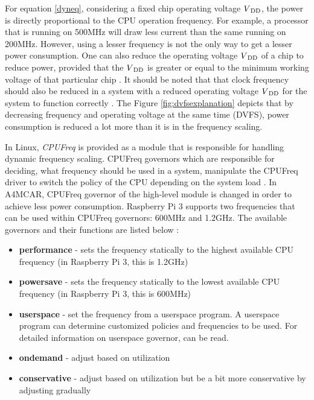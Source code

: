 For equation \ref{dyneq}, considering a fixed chip operating voltage ${V\textsubscript{DD}}$, the power is directly proportional to the CPU operation frequency. For example, a processor that is running on 500MHz will draw less current than the same running on 200MHz. However, using a lesser frequency is not the only way to get a lesser power consumption. One can also reduce the operating voltage ${V\textsubscript{DD}}$ of a chip to reduce power, provided that the ${V\textsubscript{DD}}$ is greater or equal to the minimum working voltage of that particular chip \cite{dvfspaper}. It should be noted that that clock frequency should also be reduced in a system with a reduced operating voltage ${V\textsubscript{DD}}$ for the system to function correctly \cite{dvfspaper2}. The Figure \ref{fig:dvfsexplanation} depicts that by decreasing frequency and operating voltage at the same time (DVFS), power consumption is reduced a lot more than it is in the frequency scaling.

In Linux, \textit{CPUFreq} \cite{cpufrequencyscaling} is provided as a module that is responsible for handling dynamic frequency scaling. CPUFreq governors which are responsible for deciding, what frequency should be used in a system, manipulate the CPUFreq driver to switch the policy of the CPU depending on the system load \cite{cpufrequencyscaling}. In A4MCAR, CPUFreq governor of the high-level module is changed in order to achieve less power consumption. Raspberry Pi 3 supports two frequencies that can be used within CPUFreq governors: 600MHz and 1.2GHz. The available governors and their functions are listed below \cite{gateworks}:

\begin{itemize}
	\item \textbf{performance} - sets the frequency statically to the highest available CPU frequency (in Raspberry Pi 3, this is 1.2GHz)
	\item \textbf{powersave} - sets the frequency statically to the lowest available CPU frequency (in Raspberry Pi 3, this is 600MHz)
	\item \textbf{userspace} - set the frequency from a userspace program. A userspace program can determine customized policies and frequencies to be used. For detailed information on userspace governor, \cite{gateworks} can be read.
	\item \textbf{ondemand} - adjust based on utilization
	\item \textbf{conservative} - adjust based on utilization but be a bit more conservative by adjusting gradually
\end{itemize}

